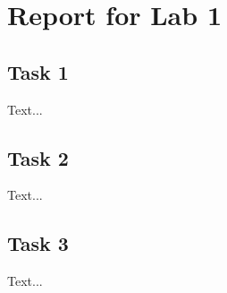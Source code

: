 \documentclass[a4paper, DIV12, headsepline]{scrartcl}
\begin{document}
\section*{Report for Lab 1}
\subsection*{Task 1}
Text...

\subsection*{Task 2}
Text...

\subsection*{Task 3}
Text...
\end{document}
